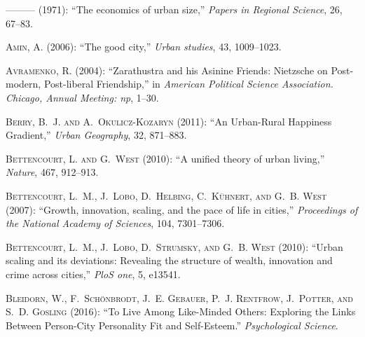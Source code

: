 \documentclass[11pt, letterpaper]{article}
\begin{document}
\begin{spacing}{1.4}
\begin{thebibliography}{92}
---\hspace{-.1pt}---\hspace{-.1pt}--- (1971): \enquote{The economics of urban
  size,} \emph{Papers in Regional Science}, 26, 67--83.

\textsc{Amin, A.} (2006): \enquote{The good city,} \emph{Urban studies}, 43,
  1009--1023.

\textsc{Avramenko, R.} (2004): \enquote{Zarathustra and his Asinine Friends:
  Nietzsche on Post-modern, Post-liberal Friendship,} in \emph{American
  Political Science Association. Chicago, Annual Meeting: np}, 1--30.

\textsc{Berry, B.~J. and A.~Okulicz-Kozaryn} (2011): \enquote{An Urban-Rural
  Happiness Gradient,} \emph{Urban Geography}, 32, 871--883.

\textsc{Bettencourt, L. and G.~West} (2010): \enquote{A unified theory of urban
  living,} \emph{Nature}, 467, 912--913.

\textsc{Bettencourt, L.~M., J.~Lobo, D.~Helbing, C.~K{\"u}hnert, and G.~B.
  West} (2007): \enquote{Growth, innovation, scaling, and the pace of life in
  cities,} \emph{Proceedings of the National Academy of Sciences}, 104,
  7301--7306.

\textsc{Bettencourt, L.~M., J.~Lobo, D.~Strumsky, and G.~B. West} (2010):
  \enquote{Urban scaling and its deviations: Revealing the structure of wealth,
  innovation and crime across cities,} \emph{PloS one}, 5, e13541.

\textsc{Bleidorn, W., F.~Sch{\"o}nbrodt, J.~E. Gebauer, P.~J. Rentfrow,
  J.~Potter, and S.~D. Gosling} (2016): \enquote{To Live Among Like-Minded
  Others: Exploring the Links Between Person-City Personality Fit and
  Self-Esteem.} \emph{Psychological Science}.


\end{thebibliography}
\end{spacing}
\end{document}
